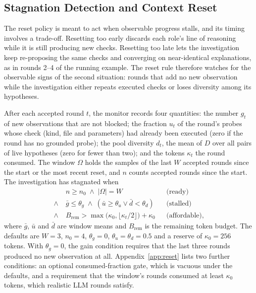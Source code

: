 \documentclass[a4paper,fleqn]{cas-sc}
\begin{document}
\subsection{Stagnation Detection and Context Reset}\label{sec:reset}
The reset policy is meant to act when observable progress stalls, and its timing involves a trade-off. Resetting too early discards each role's line of reasoning while it is still producing new checks. Resetting too late lets the investigation keep re-proposing the same checks and converging on near-identical explanations, as in rounds 2--4 of the running example. The reset rule therefore watches for the observable signs of the second situation: rounds that add no new observation while the investigation either repeats executed checks or loses diversity among its hypotheses.

After each accepted round $t$, the monitor records four quantities: the number $g_t$ of new observations that are not blocked; the fraction $u_t$ of the round's probes whose check (kind, file and parameters) had already been executed (zero if the round has no grounded probe); the pool diversity $d_t$, the mean of $D$ over all pairs of live hypotheses (zero for fewer than two); and the tokens $\kappa_t$ the round consumed. The window $\Omega$ holds the samples of the last $W$ accepted rounds since the start or the most recent reset, and $n$ counts accepted rounds since the start. The investigation has stagnated when
\begin{equation}\label{eq:reset}
\begin{aligned}
&n\ge n_0\;\wedge\;|\Omega|=W
&&\text{(ready)}\\
\wedge\;&\bar g\le\theta_g\;\wedge\;(\bar u\ge\theta_u\vee\bar d<\theta_d)
&&\text{(stalled)}\\
\wedge\;&B_{\mathrm{rem}}>\max\bigl(\kappa_0,\lfloor\kappa_t/2\rfloor\bigr)+\kappa_0
&&\text{(affordable)},
\end{aligned}
\end{equation}
where $\bar g$, $\bar u$ and $\bar d$ are window means and $B_{\mathrm{rem}}$ is the remaining token budget. The defaults are $W=3$, $n_0=4$, $\theta_g=0$, $\theta_u=\theta_d=0.5$ and a reserve of $\kappa_0=256$ tokens. With $\theta_g=0$, the gain condition requires that the last three rounds produced no new observation at all. Appendix~\ref{app:reset} lists two further conditions: an optional consumed-fraction gate, which is vacuous under the defaults, and a requirement that the window's rounds consumed at least $\kappa_0$ tokens, which realistic LLM rounds satisfy.
\end{document}
